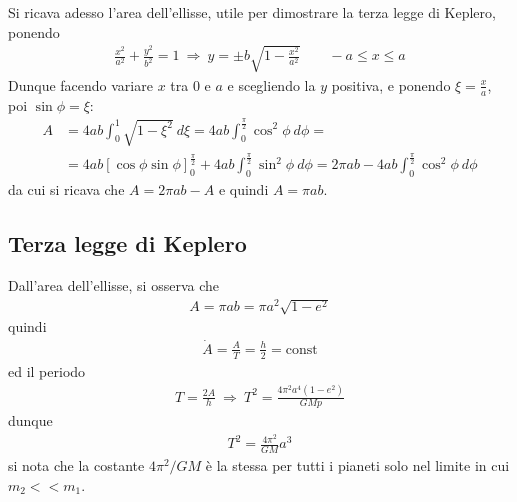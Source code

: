\documentclass[a4paper, oneside]{book}
\begin{document}
Si ricava adesso l'area dell'ellisse, utile per dimostrare la terza legge di Keplero, ponendo
\begin{gather*}
    \frac{x^{2}}{a^{2}} + \frac{y^{2}}{b^{2}} = 1\ \Longrightarrow \ y = \pm b \sqrt{1 - \frac{x^{2}}{a^{2}}}  \qquad -a \leq x \leq a
\end{gather*}
Dunque facendo variare $x$ tra 0 e $a$ e scegliendo la $y$ positiva, e ponendo $\xi = \frac{x}{a}$, poi $\sin\phi = \xi$: 
\begin{align*}
    A &= 4ab \int_{0}^{1} \sqrt{1 - \xi^{2}} \ d\xi = 4ab \int_{0}^{\frac{\pi}{2}} \cos^{2}\phi \ d\phi  = \\
    &= 4ab \left[\cos\phi \sin\phi\right]^{\frac{\pi}{2}}_{0} + 4ab \int_{0}^{\frac{\pi}{2}} \sin^{2}\phi \ d\phi = 2\pi ab - 4ab \int_{0}^{\frac{\pi}{2}} \cos^{2}\phi \ d\phi  
\end{align*}
da cui si ricava che $A = 2\pi ab - A$ e quindi $A = \pi ab$.

\subsection{Terza legge di Keplero}
Dall'area dell'ellisse, si osserva che 
\begin{gather*}
    A = \pi a b = \pi a^{2} \sqrt{1 - e^{2}} 
\end{gather*}
quindi 
\begin{gather*}
    \dot{A} = \frac{A}{T} = \frac{h}{2} = \text{const} 
\end{gather*}
ed il periodo 
\begin{gather*}
    T = \frac{2A}{h} \ \Longrightarrow \ T^{2} = \frac{4\pi^{2}a^{4}(1 - e^{2})}{GMp}
\end{gather*}
dunque 
\begin{align}
    \boxed{T^{2} = \frac{4\pi^{2}}{GM}a^{3}}
\end{align}
si nota che la costante $4\pi^{2}/GM$ è la stessa per tutti 
i pianeti solo nel limite in cui $m_2 << m_1$.

\clearpage
\end{document}
